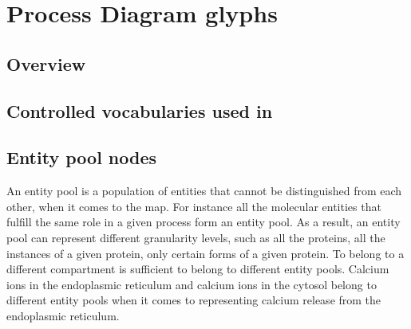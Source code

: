 
\chapter{Process Diagram glyphs}
\label{chap:glyphs}



\section{Overview}



\section{Controlled vocabularies used in \SBGNPDLone}\label{sec:CVs}




\section{Entity pool nodes}\label{sec:EPNs}

An entity pool is a population of entities that cannot be distinguished from each other, when it comes to the \SBGNPDLone map. For instance all the molecular  entities that fulfill the same role in a given process form an entity pool. As a result, an entity pool can represent different granularity levels, such as all the proteins, all the instances of a given protein, only certain forms of a given protein. To belong to a different compartment is sufficient to belong to different entity pools. Calcium ions in the endoplasmic reticulum and calcium ions in the cytosol belong to different entity pools when it comes to representing calcium release from the endoplasmic reticulum.

